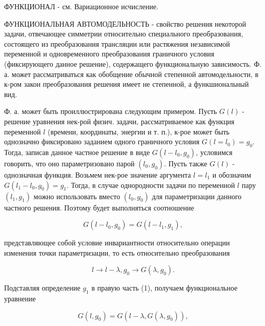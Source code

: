 \documentclass[10pt]{article}
\begin{document}
ФУНКЦИОНАЛ - см. Вариационное исчисление.



ФУНКЦИОНАЛЬНАЯ АВТОМОДЕЛЬНОСТЬ - свойство решения некоторой задачи, отвечающее симметрии относительно специального преобразования, состоящего из преобразования трансляции или растяжения независимой переменной и одновременного преобразования граничного условия (фиксирующего данное решение), содержащего функциональную зависимость. Ф. а. может рассматриваться как обобщение обычной степенной автомодельности, в к-ром закон преобразования решения имеет не степенной, а функшиональный вид.



Ф. а. может быть проиллюстрирована следующим примером. Пусть $G(l)$ - решение уравнения нек-рой физич. задачи, рассматриваемое как функция переменной $l$ (времени, координаты, энергии и т. п.), к-рое может быть однозначно фиксировано заданием одного граничного условия $G\left(l=l_{0}\right)=g_{0}$. Тогда, записав данное частное решение в виде $G\left(l-l_{0}, g_{0}\right)$, условимся говорить, что оно параметризовано парой $\left(l_{0}, g_{0}\right)$. Пусть также $G(l)$ - однозначная функция. Возьмем нек-рое значение аргумента $l=l_{1}$ и обозначим $G\left(l_{1}-l_{0}, g_{0}\right)=g_{1}$. Тогда, в случае однородности задачи по переменной $l$ пару $\left(l_{1}, g_{1}\right)$ можно использовать вместо $\left(l_{0}, g_{0}\right)$ для параметризации данного частного решения. Поэтому будет выполняться соотношение



\[

G\left(l-l_{0}, g_{0}\right)=G\left(l-l_{1}, g_{1}\right),

\]



представляющее собой условие инвариантности относительно операции изменения точки параметризации, то есть относительно преобразования



\[

l \rightarrow l-\lambda, g_{0} \rightarrow G\left(\lambda, g_{0}\right) .

\]



Подставляя определение $g_{1}$ в правую часть (1), получаем функциональное уравнение



\[

G\left(l, g_{0}\right)=G\left(l-\lambda, G\left(\lambda, g_{0}\right)\right),

\]
\end{document}
